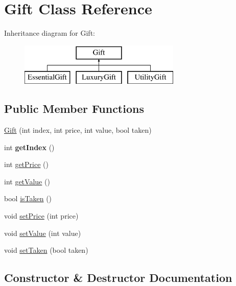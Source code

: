 \hypertarget{class_gift}{}\section{Gift Class Reference}
\label{class_gift}
Inheritance diagram for Gift\+:\begin{figure}[H]
\begin{center}
\leavevmode
\includegraphics[height=2.000000cm]{class_gift}
\end{center}
\end{figure}
\subsection*{Public Member Functions}
\begin{DoxyCompactItemize}
\item 
\hyperlink{class_gift_aa4a28b6425476dfef4b0ad80626abd08}{Gift} (int index, int price, int value, bool taken)
\item 
\mbox{\label{class_gift_aff13bdd40ae333095a41ba55e25f7c28}} 
int {\bfseries get\+Index} ()
\item 
int \hyperlink{class_gift_aa114ca9629b5f02e4df6731d33c69373}{get\+Price} ()
\item 
int \hyperlink{class_gift_aabddc4d671de70d9002461076999a574}{get\+Value} ()
\item 
bool \hyperlink{class_gift_ab2c9c5d3db64a71a6cd6263648c89167}{is\+Taken} ()
\item 
void \hyperlink{class_gift_a3e497fb858aade883c0b18c979963d83}{set\+Price} (int price)
\item 
void \hyperlink{class_gift_a40368c3ac78745ce67d3a2496ba3e9ce}{set\+Value} (int value)
\item 
void \hyperlink{class_gift_a9c7541319435d48c46ea47ec16d7a0f6}{set\+Taken} (bool taken)
\end{DoxyCompactItemize}


\subsection{Constructor \& Destructor Documentation}
\mbox{\label{class_gift_aa4a28b6425476dfef4b0ad80626abd08}} 
